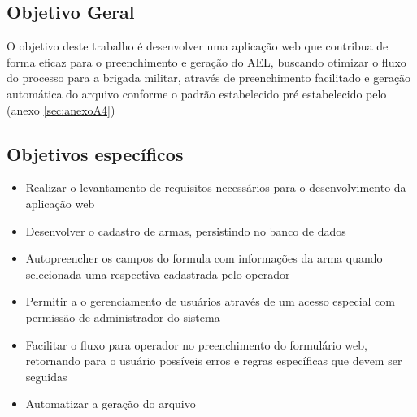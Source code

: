 \subsection{Objetivo Geral}
O objetivo deste trabalho é desenvolver uma aplicação web que contribua de forma eficaz para o preenchimento e geração do AEL, buscando otimizar o fluxo do processo para a brigada militar, através de preenchimento facilitado e geração automática do arquivo conforme o padrão estabelecido pré estabelecido pelo (anexo \ref{sec:anexoA4})

\subsection{Objetivos específicos}
\begin{itemize}
    \item Realizar o levantamento de requisitos necessários para o desenvolvimento da aplicação web 
    \item Desenvolver o cadastro de armas, persistindo no banco de dados 
    \item Autopreencher os campos do formula com informações da arma quando selecionada uma respectiva cadastrada pelo operador
    \item Permitir a o gerenciamento de usuários através de um acesso especial com permissão de administrador do sistema 
    \item Facilitar o  fluxo para operador no preenchimento do formulário web, retornando para o usuário possíveis erros e regras específicas que devem ser seguidas
    \item Automatizar a geração do arquivo

\end{itemize}  
